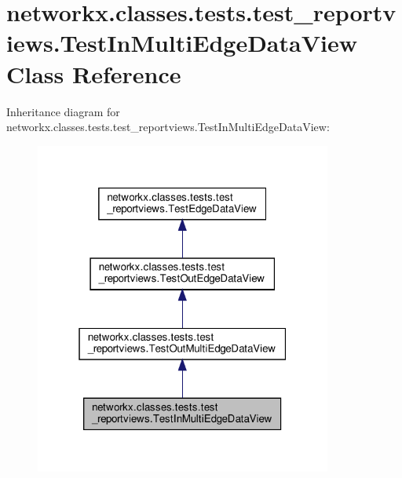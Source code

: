 \hypertarget{classnetworkx_1_1classes_1_1tests_1_1test__reportviews_1_1TestInMultiEdgeDataView}{}\section{networkx.\+classes.\+tests.\+test\+\_\+reportviews.\+Test\+In\+Multi\+Edge\+Data\+View Class Reference}
\label{classnetworkx_1_1classes_1_1tests_1_1test__reportviews_1_1TestInMultiEdgeDataView}


Inheritance diagram for networkx.\+classes.\+tests.\+test\+\_\+reportviews.\+Test\+In\+Multi\+Edge\+Data\+View\+:
\nopagebreak
\begin{figure}[H]
\begin{center}
\leavevmode
\includegraphics[width=277pt]{classnetworkx_1_1classes_1_1tests_1_1test__reportviews_1_1TestInMultiEdgeDataView__inherit__graph}
\end{center}
\end{figure}


